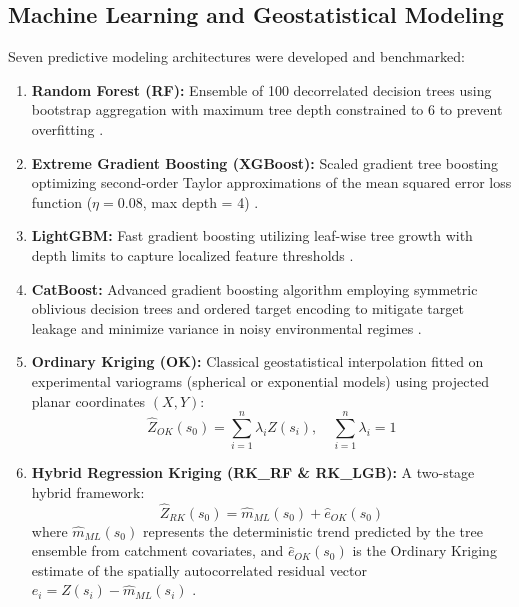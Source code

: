 \documentclass[authoryear,preprint,12pt]{elsarticle}
\begin{document}
\subsection{Machine Learning and Geostatistical Modeling}
Seven predictive modeling architectures were developed and benchmarked:
\begin{enumerate}
    \item \textbf{Random Forest (RF):} Ensemble of 100 decorrelated decision trees using bootstrap aggregation with maximum tree depth constrained to 6 to prevent overfitting \citep{Breiman2001}.
    \item \textbf{Extreme Gradient Boosting (XGBoost):} Scaled gradient tree boosting optimizing second-order Taylor approximations of the mean squared error loss function ($\eta = 0.08$, max depth = 4) \citep{Chen2016}.
    \item \textbf{LightGBM:} Fast gradient boosting utilizing leaf-wise tree growth with depth limits to capture localized feature thresholds \citep{Ke2017}.
    \item \textbf{CatBoost:} Advanced gradient boosting algorithm employing symmetric oblivious decision trees and ordered target encoding to mitigate target leakage and minimize variance in noisy environmental regimes \citep{Prokhorenkova2018}.
    \item \textbf{Ordinary Kriging (OK):} Classical geostatistical interpolation fitted on experimental variograms (spherical or exponential models) using projected planar coordinates $(X, Y)$:
    \begin{equation}
    \hat{Z}_{OK}(s_0) = \sum_{i=1}^n \lambda_i Z(s_i), \quad \sum_{i=1}^n \lambda_i = 1
    \end{equation}
    \item \textbf{Hybrid Regression Kriging (RK\_RF \& RK\_LGB):} A two-stage hybrid framework:
    \begin{equation}
    \hat{Z}_{RK}(s_0) = \hat{m}_{ML}(s_0) + \hat{e}_{OK}(s_0)
    \end{equation}
    where $\hat{m}_{ML}(s_0)$ represents the deterministic trend predicted by the tree ensemble from catchment covariates, and $\hat{e}_{OK}(s_0)$ is the Ordinary Kriging estimate of the spatially autocorrelated residual vector $e_i = Z(s_i) - \hat{m}_{ML}(s_i)$ \citep{Hengl2004}.
\end{enumerate}
\end{document}
